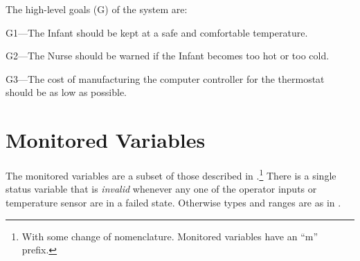 \documentclass[fontsize=12pt,paper=letter,twoside]{scrartcl}
\begin{document}
The high-level goals (G) of the system are:

\begin{mylist}
\item G1---The Infant should be kept at a safe and comfortable temperature.

\item G2---The Nurse should be warned if the Infant becomes too hot or too cold.

\item G3---The cost of manufacturing the computer controller for the thermostat should be as low as possible.
\end{mylist}

\section{Monitored Variables}

The monitored variables are a subset of those described in \cite{REMH}.\footnote{With some change of nomenclature. Monitored variables have an ``m'' prefix.} There is a single status variable  that is \emph{invalid} whenever any one of the operator inputs or temperature sensor are in a failed state. Otherwise types and ranges are as in \cite{REMH}.
\end{document}
